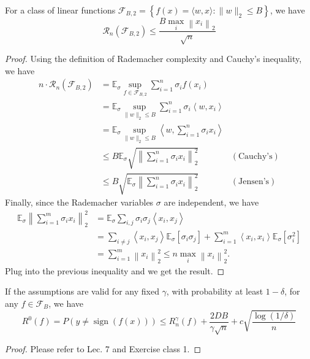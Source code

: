 \begin{theorem}
For a class of linear functions $\mathcal{F}_{B, 2}=\left\{f(x)=\langle w, x\rangle:\|w\|_{2} \leq B\right\}$, we have
$$
{\mathcal{R}}_{n}\left(\mathcal{F}_{B, 2}
\right) \leq \frac{B \max _{i}\left\|x_{i}\right\|_{2}}{\sqrt{n}}
$$
\end{theorem}
\begin{proof}
Using the definition of Rademacher complexity and Cauchy's inequality, we have
\begin{align*}
n \cdot \mathcal{R}_n\left(\mathcal{F}_{B, 2}\right) &={\mathbb{E}}_\sigma\sup _{f \in \mathcal{F}_{B, 2}} \sum_{i=1}^{n} \sigma_{i} f(x_i)\\
&={\mathbb{E}_\sigma}\sup _{\|{w}\|_2 \leq B} \sum_{i=1}^{n} \sigma_{i}\left\langle{w}, x_{i}\right\rangle \\
&={\mathbb{E}_\sigma}\sup _{\|{w}\|_2 \leq B}\left\langle{w}, \sum_{i=1}^{n} \sigma_{i} x_{i}\right\rangle \\
& \leq B {\mathbb{E}_\sigma}\sqrt{\left\|\sum_{i=1}^{n} \sigma_{i} x_{i}\right\|^2_{2}} & (\text{Cauchy's}) \\
& \leq B \sqrt{\mathbb{E}_\sigma \left\|\sum_{i=1}^{n} \sigma_{i} x_{i}\right\|^2_{2}} & (\text{Jensen's})
\end{align*}
Finally, since the Rademacher variables $\sigma$ are independent, we have
\begin{align*}
{\mathbb{E}_\sigma}\left\|\sum_{i=1}^{m} \sigma_{i} x_{i}\right\|_{2}^{2}&={\mathbb{E}_\sigma}\sum_{i, j} \sigma_{i} \sigma_{j}\left\langle x_{i}, x_{j}\right\rangle\\
&=\sum_{i \neq j}\left\langle x_{i}, x_{j}\right\rangle \mathbb{E}_\sigma\left[\sigma_{i} \sigma_{j}\right]+\sum_{i=1}^{m}\left\langle x_{i}, x_{i}\right\rangle {\mathbb{E}_\sigma}[\sigma_{i}^{2}] \\
&=\sum_{i=1}^{m}\left\|x_{i}\right\|_{2}^{2} \leq n \max _{i}\left\|{x}_{i}\right\|_{2}^{2}.
\end{align*}
Plug into the previous inequality and we get the result.
\end{proof}

\begin{theorem}
If the assumptions are valid for any fixed $\gamma$, with probability at least $1 - \delta$, for any $f \in \mathcal{F}_{B}$, we have
$$
R^{0}(f)=P(y \neq \operatorname{sign}(f(x))) \leq R_{n}^{\gamma}(f)+\frac{2 D B}{\gamma \sqrt{n}}+c \sqrt{\frac{\log (1 / \delta)}{n}}
$$
\end{theorem}
\begin{proof}
Please refer to Lec. 7 and Exercise class 1.
\end{proof}

